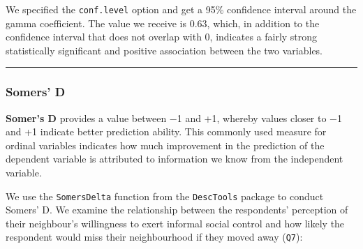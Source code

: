 \documentclass[
]{book}
\newenvironment{Shaded}{\begin{snugshade}}{\end{snugshade}}
\newcommand{\AttributeTok}[1]{\textcolor[rgb]{0.77,0.63,0.00}{#1}}
\newcommand{\CommentTok}[1]{\textcolor[rgb]{0.56,0.35,0.01}{\textit{#1}}}
\newcommand{\DecValTok}[1]{\textcolor[rgb]{0.00,0.00,0.81}{#1}}
\newcommand{\FunctionTok}[1]{\textcolor[rgb]{0.00,0.00,0.00}{#1}}
\newcommand{\NormalTok}[1]{#1}
\newcommand{\OtherTok}[1]{\textcolor[rgb]{0.56,0.35,0.01}{#1}}
\newcommand{\SpecialCharTok}[1]{\textcolor[rgb]{0.00,0.00,0.00}{#1}}
\newcommand{\StringTok}[1]{\textcolor[rgb]{0.31,0.60,0.02}{#1}}
\begin{document}
\begin{Shaded}
\end{Shaded}

We specified the \texttt{conf.level} option and get a 95\% confidence interval around the gamma coefficient. The value we receive is 0.63, which, in addition to the confidence interval that does not overlap with 0, indicates a fairly strong statistically significant and positive association between the two variables.

\begin{center}\rule{0.5\linewidth}{0.5pt}\end{center}

\hypertarget{somers-d}{%
\subsubsection{Somers' D}\label{somers-d}}

\textbf{Somer's D} provides a value between −1 and +1, whereby values closer to −1 and +1 indicate better prediction ability. This commonly used measure for ordinal variables indicates how much improvement in the prediction of the dependent variable is attributed to information we know from the independent variable.

We use the \texttt{SomersDelta} function from the \texttt{DescTools} package to conduct Somers' D. We examine the relationship between the respondents' perception of their neighbour's willingness to exert informal social control and how likely the respondent would miss their neighbourhood if they moved away (\texttt{Q7}):

\begin{Shaded}
\end{Shaded}
\end{document}
